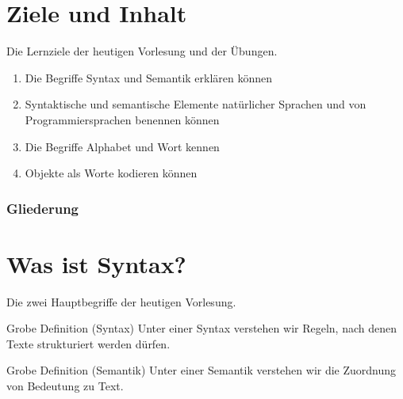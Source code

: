 %
%
%

%
%
%



\subtitle{Our first quantum algorithm}

\date{\today}




\begin{frame}
  \maketitle
\end{frame}


\section*{Ziele und Inhalt}

\begin{frame}{Die Lernziele der heutigen Vorlesung und der Übungen.} 
  \begin{enumerate}
  \item Die Begriffe Syntax und Semantik erklären können
  \item Syntaktische und semantische Elemente natürlicher Sprachen und
    von Programmiersprachen benennen können
  \item Die Begriffe Alphabet und Wort kennen
  \item Objekte als Worte kodieren können
  \end{enumerate}
\end{frame}

\begin{frame}\frametitle<presentation>{Gliederung}
  \tableofcontents
\end{frame}


\section{Was ist Syntax?}

\begin{frame}{Die zwei Hauptbegriffe der heutigen Vorlesung.}
  \begin{block}{Grobe Definition (Syntax)}
    Unter einer \alert{Syntax} verstehen wir \alert{Regeln}, nach denen
    Texte \alert{strukturiert} werden dürfen. 
  \end{block}
  \begin{block}{Grobe Definition (Semantik)}
    Unter einer \alert{Semantik} verstehen wir die Zuordnung von
    \alert{Bedeutung} zu Text.
  \end{block}
\end{frame}


